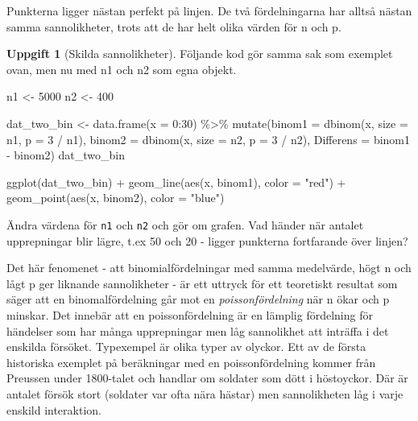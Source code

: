 \documentclass[
]{book}
\newenvironment{Shaded}{\begin{snugshade}}{\end{snugshade}}
\newcommand{\AttributeTok}[1]{\textcolor[rgb]{0.77,0.63,0.00}{#1}}
\newcommand{\DecValTok}[1]{\textcolor[rgb]{0.00,0.00,0.81}{#1}}
\newcommand{\FunctionTok}[1]{\textcolor[rgb]{0.00,0.00,0.00}{#1}}
\newcommand{\NormalTok}[1]{#1}
\newcommand{\OtherTok}[1]{\textcolor[rgb]{0.56,0.35,0.01}{#1}}
\newcommand{\SpecialCharTok}[1]{\textcolor[rgb]{0.00,0.00,0.00}{#1}}
\newcommand{\StringTok}[1]{\textcolor[rgb]{0.31,0.60,0.02}{#1}}
\theoremstyle{definition}
\theoremstyle{definition}
\theoremstyle{definition}
\newtheorem{exercise}{Uppgift}[chapter]
\theoremstyle{definition}
\theoremstyle{remark}
\begin{document}
Punkterna ligger nästan perfekt på linjen. De två fördelningarna har alltså nästan samma sannolikheter, trots att de har helt olika värden för n och p.

\begin{exercise}[Skilda sannolikheter]
Följande kod gör samma sak som exemplet ovan, men nu med n1 och n2 som egna objekt.

\begin{Shaded}
\begin{Highlighting}[]
\NormalTok{n1 }\OtherTok{\textless{}{-}} \DecValTok{5000}
\NormalTok{n2 }\OtherTok{\textless{}{-}} \DecValTok{400}

\NormalTok{dat\_two\_bin }\OtherTok{\textless{}{-}} \FunctionTok{data.frame}\NormalTok{(}\AttributeTok{x =} \DecValTok{0}\SpecialCharTok{:}\DecValTok{30}\NormalTok{) }\SpecialCharTok{\%\textgreater{}\%} 
  \FunctionTok{mutate}\NormalTok{(}\AttributeTok{binom1 =} \FunctionTok{dbinom}\NormalTok{(x, }\AttributeTok{size =}\NormalTok{ n1, }\AttributeTok{p =} \DecValTok{3} \SpecialCharTok{/}\NormalTok{ n1),}
         \AttributeTok{binom2 =} \FunctionTok{dbinom}\NormalTok{(x, }\AttributeTok{size =}\NormalTok{ n2, }\AttributeTok{p =} \DecValTok{3} \SpecialCharTok{/}\NormalTok{ n2),}
         \AttributeTok{Differens =}\NormalTok{ binom1 }\SpecialCharTok{{-}}\NormalTok{ binom2)}
\NormalTok{dat\_two\_bin}

\FunctionTok{ggplot}\NormalTok{(dat\_two\_bin) }\SpecialCharTok{+}
  \FunctionTok{geom\_line}\NormalTok{(}\FunctionTok{aes}\NormalTok{(x, binom1), }\AttributeTok{color =} \StringTok{"red"}\NormalTok{) }\SpecialCharTok{+}
  \FunctionTok{geom\_point}\NormalTok{(}\FunctionTok{aes}\NormalTok{(x, binom2), }\AttributeTok{color =} \StringTok{"blue"}\NormalTok{)}
\end{Highlighting}
\end{Shaded}

Ändra värdena för \texttt{n1} och \texttt{n2} och gör om grafen. Vad händer när antalet upprepningar blir lägre, t.ex 50 och 20 - ligger punkterna fortfarande över linjen?
\end{exercise}

Det här fenomenet - att binomialfördelningar med samma medelvärde, högt n och lågt p ger liknande sannolikheter - är ett uttryck för ett teoretiskt resultat som säger att en binomalfördelning går mot en \emph{poissonfördelning} när n ökar och p minskar. Det innebär att en poissonfördelning är en lämplig fördelning för händelser som har många upprepningar men låg sannolikhet att inträffa i det enskilda försöket. Typexempel är olika typer av olyckor. Ett av de första historiska exemplet på beräkningar med en poissonfördelning kommer från Preussen under 1800-talet och handlar om soldater som dött i höstoyckor. Där är antalet försök stort (soldater var ofta nära hästar) men sannolikheten låg i varje enskild interaktion.
\end{document}
